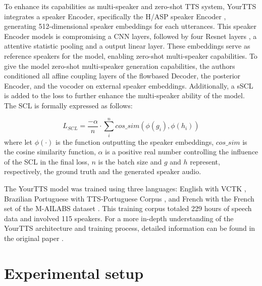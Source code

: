 To enhance its capabilities as multi-speaker and zero-shot \ac{TTS} system, YourTTS integrates a speaker Encoder, specifically the H/ASP speaker Encoder \cite{heo2020clova}, generating 512-dimensional speaker embeddings for each utterances. This speaker Encoder models is compromising a \ac{CNN} layers, followed by four Resnet layers \cite{targ2016resnet}, a attentive statistic pooling and a output linear layer. These embeddings serve as reference speakers for the model, enabling zero-shot multi-speaker capabilities. To give the model zero-shot multi-speaker generation capabilities, the authors conditioned all affine coupling layers of the flowbased Decoder, the posterior Encoder, and the vocoder on external speaker embeddings. Additionally, a s\ac{SCL} is added to the loss to further enhance the multi-speaker ability of the model. The \ac{SCL} is formally expressed as follows:

\begin{equation}
    L_{SCL} = \frac{-\alpha}{n} \cdot \sum_{i}^{n} cos\_sim(\phi(g_i), \phi(h_i))
\end{equation}
where let $\phi(\cdot)$ is the function outputting the speaker embeddings, $cos\_sim$ is the cosine similarity function, $\alpha$ is a positive real number controlling the influence of the \ac{SCL} in the final loss, $n$ is the batch size and $g$ and $h$ represent, respectively, the ground truth and the generated speaker audio.

The YourTTS model was trained using three languages: English with VCTK \cite{veaux2016superseded}, Brazilian Portuguese with TTS-Portuguese Corpus \cite{casanova2022tts}, and French with the French set of the M-AILABS dataset \cite{mailabs}. This training corpus totaled 229 hours of speech data and involved 115 speakers. For a more in-depth understanding of the YourTTS architecture and training process, detailed information can be found in the original paper \cite{casanova2022yourtts}.


\section{Experimental setup}
\label{section:methods}

